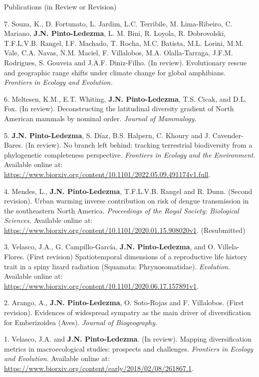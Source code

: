 \documentclass{resume} %
\begin{document}
\begin{rSection}{Publications (in Review or Revision)} 

{7.} {Souza, K., D. Fortunato, L. Jardim, L.C. Terribile, M. Lima-Ribeiro, C. Mariano,} {\bf{J.N. Pinto-Ledezma}}, {L. M. Bini, R. Loyola, R. Dobrovolski, T.F.L.V.B. Rangel, I.F. Machado, T. Rocha, M.C. Batista, M.L. Lorini, M.M. Vale, C.A. Navas, N.M. Maciel, F. Villalobos, M.A. Olalla-Tarraga, J.F.M. Rodrigues, S. Gouveia and J.A.F. Diniz-Filho. (In review). Evolutionary rescue and geographic range shifts under climate change for global amphibians.} {\em Frontiers in Ecology and Evolution.}

{6.} {Meltesen, K.M., E.T. Whiting,} {\bf{J.N. Pinto-Ledezma}}, {T.S. Cicak, and D.L. Fox. (In review). Deconstructing the latitudinal diversity gradient of North American mammals by nominal order.} {\em Journal of Mammalogy.}

{5.} {\bf{J.N. Pinto-Ledezma}}, {S. Díaz, B.S. Halpern, C. Khoury and J. Cavender-Bares. (In review). No branch left behind: tracking terrestrial biodiversity from a phylogenetic completeness perspective.} {\em Frontiers in Ecology and the Environment.} {Available online at:} \url {https://www.biorxiv.org/content/10.1101/2022.05.09.491174v1.full}.

{4.} {Mendes, L.,} {\bf{J.N. Pinto-Ledezma}}, {T.F.L.V.B. Rangel and R. Dunn. (Second revision). Urban warming inverse contribution on risk of dengue transmission in the southeastern North America.} {\em Proceedings of the Royal Society: Biological Sciences.} {Available online at:} \url {https://www.biorxiv.org/content/10.1101/2020.01.15.908020v1}. {(Resubmitted)}

{3.} {Velasco, J.A., G. Campillo-García,} {\bf{J.N. Pinto-Ledezma}}, {and O. Villela-Flores. (First revision) Spatiotemporal dimensions of a reproductive life history trait in a spiny lizard radiation (Squamata: Phrynosomatidae).} {\em Evolution.} {Available online at:} \url {https://www.biorxiv.org/content/10.1101/2020.06.17.157891v1}.

{2.} {Arango, A.,} {\bf{J.N. Pinto-Ledezma}}, { O. Soto-Rojas and F. Villalobos. (First revision). Evidences of widespread sympatry as the main driver of diversification for Emberizoidea (Aves).} {\em Journal of Biogeography.}

{1.} {Velasco, J.A. and} {\bf{J.N. Pinto-Ledezma}}. {(In review). Mapping diversification metrics in macroecological studies: prospects and challenges.} {\em Frontiers in Ecology and Evolution.} {Available online at:} \url {https://www.biorxiv.org/content/early/2018/02/08/261867.1}.


\end{rSection}
\end{document}
